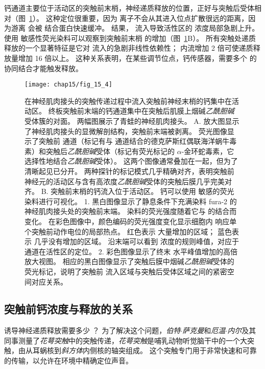 钙通道主要位于活动区的突触前末梢，神经递质释放的位置，正好与突触后受体相对（图~\ref{fig:15_4}）。 
这种定位很重要，因为  离子不会从其进入位点扩散很远的距离，因为游离  会被  结合蛋白快速缓冲。 
结果， 流入导致活性区的  浓度局部急剧上升。 
使用  敏感性荧光染料可以观察到突触前末梢  的增加（图~\ref{fig:15_4}B）。
所有突触处递质释放的一个显著特征是它对  流入的急剧非线性依赖性；
 内流增加 2 倍可使递质释放量增加 16 倍以上。 
这种关系表明，在某些调节位点，钙传感器，需要多个  的协同结合才能触发释放。


\begin{figure}[htbp]
	\centering
	\texttt{[image: chap15/fig\_15\_4]}
	\caption{在神经肌肉接头的突触传递过程中流入突触前神经末梢的钙集中在活动区。
	终板突触前末端的钙通道集中在突触后肌膜上烟碱\textit{乙酰胆碱}受体簇的对面。
	两幅图展示了青蛙的神经肌肉接头。
	A. 放大图显示了神经肌肉接头的显微解剖结构，突触前末端被剥离。
	荧光图像显示了突触前  通道（标记有与  通道结合的德克萨斯红偶联海洋蜗牛毒素）和突触后\textit{乙酰胆碱}受体（标记有荧光标记的 $\alpha$-金环蛇毒素，它选择性地结合\textit{乙酰胆碱}受体）。
	这两个图像通常叠加在一起，但为了清晰起见已分开。
	两种探针的标记模式几乎精确对齐，表明突触前神经元的活动区与含有高浓度\textit{乙酰胆碱}受体的突触后膜几乎完美对齐\cite{robitaille1990strategic}。
	B. 突触前末梢的钙流入位于活动区。
	钙可以使用  敏感的荧光染料进行可视化。
	1. 黑白图像显示了静息条件下充满染料 fura-2 的神经肌肉接头处的突触前末端。
	染料的荧光强度随着它与  的结合而变化。
	在彩色图像中，颜色编码的荧光强度变化显示细胞内  响应单个突触前动作电位的局部热点。
	红色表示  大量增加的区域；
	蓝色表示  几乎没有增加的区域。
	沿末端可以看到  浓度的规则峰值，对应于  通道在活性区的定位。
	2. 彩色图像显示了终末  水平峰值增加的高倍放大视图。
	相应的黑白图像显示了突触后膜中烟碱\textit{乙酰胆碱}受体的荧光标记，说明了突触前  流入区域与突触后受体区域之间的紧密空间对应关系\cite{wachman2004spatial}。}
	\label{fig:15_4}
\end{figure}



\subsection{突触前钙浓度与释放的关系}

诱导神经递质释放需要多少 ？ 
为了解决这个问题，\textit{伯特$\cdot$萨克曼}和\textit{厄温$\cdot$内尔}及其同事测量了\textit{花萼突触}中的突触传递，\textit{花萼突触}是哺乳动物听觉脑干中的一个大突触，由从耳蜗核到\textit{斜方体}内侧核的轴突组成。
这个突触专门用于非常快速和可靠的传输，以允许在环境中精确定位声音。


